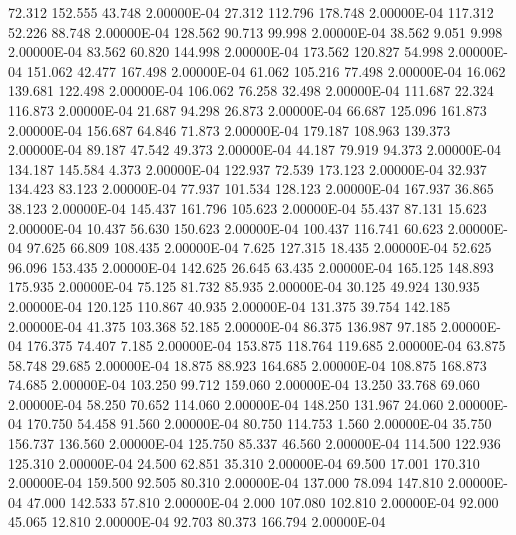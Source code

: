     72.312   152.555    43.748  2.00000E-04
    27.312   112.796   178.748  2.00000E-04
   117.312    52.226    88.748  2.00000E-04
   128.562    90.713    99.998  2.00000E-04
    38.562     9.051     9.998  2.00000E-04
    83.562    60.820   144.998  2.00000E-04
   173.562   120.827    54.998  2.00000E-04
   151.062    42.477   167.498  2.00000E-04
    61.062   105.216    77.498  2.00000E-04
    16.062   139.681   122.498  2.00000E-04
   106.062    76.258    32.498  2.00000E-04
   111.687    22.324   116.873  2.00000E-04
    21.687    94.298    26.873  2.00000E-04
    66.687   125.096   161.873  2.00000E-04
   156.687    64.846    71.873  2.00000E-04
   179.187   108.963   139.373  2.00000E-04
    89.187    47.542    49.373  2.00000E-04
    44.187    79.919    94.373  2.00000E-04
   134.187   145.584     4.373  2.00000E-04
   122.937    72.539   173.123  2.00000E-04
    32.937   134.423    83.123  2.00000E-04
    77.937   101.534   128.123  2.00000E-04
   167.937    36.865    38.123  2.00000E-04
   145.437   161.796   105.623  2.00000E-04
    55.437    87.131    15.623  2.00000E-04
    10.437    56.630   150.623  2.00000E-04
   100.437   116.741    60.623  2.00000E-04
    97.625    66.809   108.435  2.00000E-04
     7.625   127.315    18.435  2.00000E-04
    52.625    96.096   153.435  2.00000E-04
   142.625    26.645    63.435  2.00000E-04
   165.125   148.893   175.935  2.00000E-04
    75.125    81.732    85.935  2.00000E-04
    30.125    49.924   130.935  2.00000E-04
   120.125   110.867    40.935  2.00000E-04
   131.375    39.754   142.185  2.00000E-04
    41.375   103.368    52.185  2.00000E-04
    86.375   136.987    97.185  2.00000E-04
   176.375    74.407     7.185  2.00000E-04
   153.875   118.764   119.685  2.00000E-04
    63.875    58.748    29.685  2.00000E-04
    18.875    88.923   164.685  2.00000E-04
   108.875   168.873    74.685  2.00000E-04
   103.250    99.712   159.060  2.00000E-04
    13.250    33.768    69.060  2.00000E-04
    58.250    70.652   114.060  2.00000E-04
   148.250   131.967    24.060  2.00000E-04
   170.750    54.458    91.560  2.00000E-04
    80.750   114.753     1.560  2.00000E-04
    35.750   156.737   136.560  2.00000E-04
   125.750    85.337    46.560  2.00000E-04
   114.500   122.936   125.310  2.00000E-04
    24.500    62.851    35.310  2.00000E-04
    69.500    17.001   170.310  2.00000E-04
   159.500    92.505    80.310  2.00000E-04
   137.000    78.094   147.810  2.00000E-04
    47.000   142.533    57.810  2.00000E-04
     2.000   107.080   102.810  2.00000E-04
    92.000    45.065    12.810  2.00000E-04
    92.703    80.373   166.794  2.00000E-04
